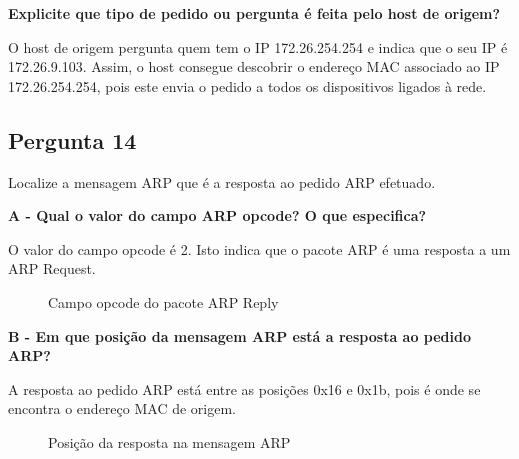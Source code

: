 \documentclass[11pt]{article}
\begin{document}
\textbf{Explicite que tipo de pedido ou pergunta é feita pelo host de origem?}

O host de origem pergunta quem tem o IP 172.26.254.254 e indica que o seu IP é 172.26.9.103. Assim, o host consegue descobrir o endereço MAC associado ao IP 172.26.254.254, pois este envia o pedido a todos os dispositivos ligados à rede.
\clearpage
\subsection{Pergunta 14}

Localize a mensagem ARP que é a resposta ao pedido ARP efetuado.

\vspace{0.5cm}

\textbf{A - Qual o valor do campo ARP opcode? O que especifica?}

O valor do campo opcode é 2. Isto indica que o pacote ARP é uma resposta a um ARP Request.

\begin{figure}[hbt!]
    \centering
    \caption{Campo opcode do pacote ARP Reply}
\end{figure}

\vspace{0.5cm}

\textbf{B - Em que posição da mensagem ARP está a resposta ao pedido ARP?}

A resposta ao pedido ARP está entre as posições 0x16 e 0x1b, pois é onde se encontra o endereço MAC de origem.

\begin{figure}[hbt!]
    \centering
    \caption{Posição da resposta na mensagem ARP}
\end{figure}
\end{document}
